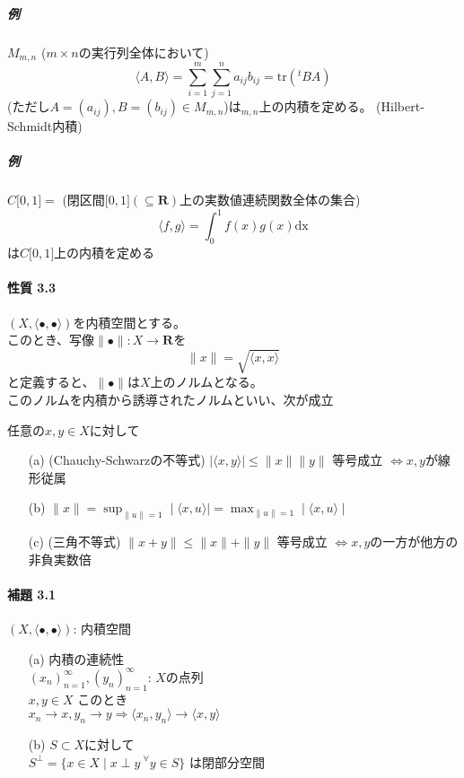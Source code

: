 \documentclass[12pt,a4paper]{article}
\begin{document}
    \subparagraph{例}
      $M_{m,n}$ ($m \times n$の実行列全体において) 
      \[ \langle A, B \rangle = \underset{i=1}{ \overset{m}{\sum}}\underset{j=1}{\overset{n}{\sum}} a_{ij} b_{ij} = \text{tr} ({}^t BA)\]
      (ただし$A= (a_{ij}), B = (b_{ij}) \in M_{m,n}$)は$_{m,n}$上の内積を定める。  (Hilbert-Schmidt内積)
    \subparagraph{例}
      $C\lbrack0,1\rbrack = $ (閉区間$\lbrack0,1\rbrack (\subseteq \mathbf{R})$上の実数値連続関数全体の集合) 
      \[\langle f, g \rangle = \int_0^1 f(x) g(x) \text{dx} \]
      は$C\lbrack0,1\rbrack$上の内積を定める
  \paragraph{性質 3.3}
    $(X, \langle \bullet, \bullet \rangle)$を内積空間とする。\\
    このとき、写像$\parallel\bullet\parallel: X \rightarrow \mathbf{R}$を
    \[ \parallel x\parallel = \sqrt{\langle x, x \rangle} \]
    と定義すると、$\parallel\bullet\parallel$は$X$上のノルムとなる。\\
    このノルムを内積から誘導されたノルムといい、次が成立

    任意の$x,y\in X$に対して
    \begin{itemize}
      \item[(a)] (Chauchy-Schwarzの不等式) $\mid\langle x, y \rangle\mid \leq \parallel x\parallel \parallel y\parallel$ 等号成立 $\Leftrightarrow x, y$が線形従属
      \item[(b)] $\parallel x \parallel = \sup_{\parallel u \parallel = 1} \mid \langle x, u \rangle \mid = \max_{\parallel u \parallel = 1} \mid \langle x, u\rangle \mid$
      \item[(c)] (三角不等式) $\parallel x + y \parallel \leq \parallel x\parallel + \parallel y \parallel$ 等号成立 $\Leftrightarrow x, y$の一方が他方の非負実数倍
    \end{itemize}
  \paragraph{補題 3.1}
  $(X, \langle \bullet,\bullet \rangle)$: 内積空間 
  \begin{itemize}
    \item[(a)] 内積の連続性 \\
      ${(x_n)}_{n=1}^\infty , {(y_n)}_{n=1}^\infty$: $X$の点列 \\
      $x, y \in X$ このとき \\
      $x_n \rightarrow x, y_n \rightarrow y \Rightarrow \langle x_n, y_n \rangle \rightarrow \langle x, y \rangle $
    \item[(b)] $S \subset X$に対して \\
      $S^\perp = \lbrace x \in X \mid x \perp y \ {}^\forall y \in S \rbrace $
      は閉部分空間
    \end{itemize}
  
\end{document}
